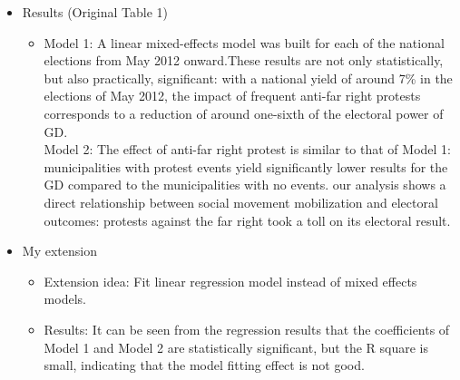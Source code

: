 \documentclass[12pt,letterpaper]{article}
\begin{document}
\begin{itemize}
\begin{itemize}
    \end{itemize}
	\item
    Results (Original Table 1)
    \begin{itemize}
    \item 
	 Model 1: A linear mixed-effects model was built for each of the national elections from May 2012 onward.These results are not only statistically, but also practically, significant: with a national yield of around 7\% in the elections of May 2012, the impact of frequent anti-far right protests corresponds to a reduction of around one-sixth of the electoral power of GD.\\
	 
	Model 2: The effect of anti-far right protest is similar to that of Model 1: municipalities with protest events yield significantly lower results for the GD compared to the municipalities with no events. our analysis shows a direct relationship between social movement mobilization and electoral outcomes: protests against the far right took a toll on its electoral result.
     \end{itemize}
    \item
    My extension
    \begin{itemize}
    	\item
    	Extension idea: Fit linear regression model instead of mixed effects models.
     \end{itemize}
     
      \begin{itemize}
     	\item Results: It can be seen from the regression results that the coefficients of Model 1 and Model 2 are statistically significant, but the R square is small, indicating that the model fitting effect is not good.
     \end{itemize}
     	
\end{itemize}     
\end{document}
